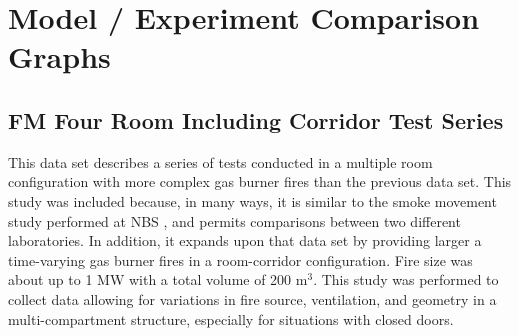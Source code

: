 \chapter{Model / Experiment Comparison Graphs}
\label{sec:Graphs}

\section{FM Four Room Including Corridor Test Series}

This data set describes a series of tests conducted in a multiple room configuration with more complex gas burner fires than the previous data set.  This study \cite{Heskestad:1986} was included because, in many ways, it is similar to the smoke movement study performed at NBS \cite{Peacock:1988}, and permits comparisons between two different laboratories. In addition, it expands upon that data set by providing larger a time-varying gas burner fires in a room-corridor configuration. Fire size was about up to 1 MW with a total volume of 200 m$^3$. This study was performed to collect data allowing for variations in fire source, ventilation, and geometry in a multi-compartment structure, especially for situations with closed doors.

